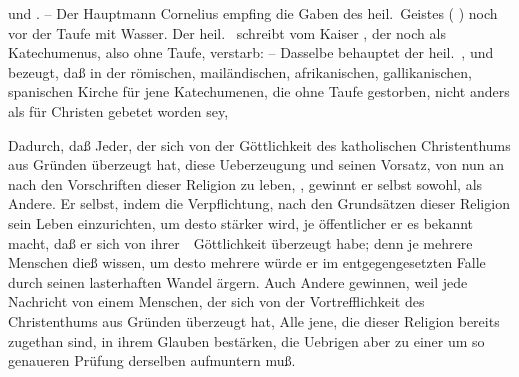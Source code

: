\begin{aufza}
\item {} und . -- Der Hauptmann Cornelius empfing die Gaben des heil.\ Geistes ( ) noch vor der Taufe mit Wasser. Der heil.\  schreibt vom Kaiser , der noch als Katechumenus, also ohne Taufe, verstarb:  -- Dasselbe behauptet der heil.\ , und bezeugt, daß in der römischen, mailändischen, afrikanischen, gallikanischen, spanischen Kirche für jene Katechumenen, die ohne Taufe gestorben, nicht anders als für Christen gebetet worden sey, \usw\
\end{aufza}

\begin{aufza}
\item Dadurch, daß Jeder, der sich von der Göttlichkeit des katholischen Christenthums aus Gründen überzeugt hat, diese Ueberzeugung und seinen Vorsatz, von nun an nach den Vorschriften dieser Religion zu leben, , gewinnt er selbst sowohl, als Andere. Er selbst, indem die Verpflichtung, nach den Grundsätzen dieser Religion sein Leben einzurichten, um desto stärker wird, je öffentlicher er es bekannt macht, daß er sich von ihrer~\ Göttlichkeit überzeugt habe; denn je mehrere Menschen dieß wissen, um desto mehrere würde er im entgegengesetzten Falle durch seinen lasterhaften Wandel ärgern. Auch Andere gewinnen, weil jede Nachricht von einem Menschen, der sich von der Vortrefflichkeit des Christenthums aus Gründen überzeugt hat, Alle jene, die dieser Religion bereits zugethan sind, in ihrem Glauben bestärken, die Uebrigen aber zu einer um so genaueren Prüfung derselben aufmuntern muß.

\end{aufza}
